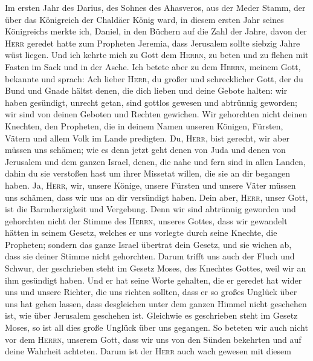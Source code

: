  Im ersten Jahr des Darius, des Sohnes des Ahasveros, aus
der Meder Stamm, der über das Königreich der Chaldäer König ward,
 in diesem ersten Jahr seines Königreichs merkte ich,
Daniel, in den Büchern auf die Zahl der Jahre, davon der \textsc{Herr}
geredet hatte zum Propheten Jeremia, dass Jerusalem sollte siebzig Jahre
wüst liegen.  Und ich kehrte mich zu Gott dem
\textsc{Herrn}, zu beten und zu flehen mit Fasten im Sack und in der
Asche.  Ich betete aber zu dem \textsc{Herrn}, meinem
Gott, bekannte und sprach: Ach lieber \textsc{Herr}, du großer und
schrecklicher Gott, der du Bund und Gnade hältst denen, die dich lieben
und deine Gebote halten:  wir haben gesündigt, unrecht
getan, sind gottlos gewesen und abtrünnig geworden; wir sind von deinen
Geboten und Rechten gewichen.  Wir gehorchten nicht deinen
Knechten, den Propheten, die in deinem Namen unseren Königen, Fürsten,
Vätern und allem Volk im Lande predigten.  Du,
\textsc{Herr}, bist gerecht, wir aber müssen uns schämen; wie es denn
jetzt geht denen von Juda und denen von Jerusalem und dem ganzen Israel,
denen, die nahe und fern sind in allen Landen, dahin du sie verstoßen
hast um ihrer Missetat willen, die sie an dir begangen haben.
 Ja, \textsc{Herr}, wir, unsere Könige, unsere Fürsten und
unsere Väter müssen uns schämen, dass wir uns an dir versündigt haben.
 Dein aber, \textsc{Herr}, unser Gott, ist die
Barmherzigkeit und Vergebung. Denn wir sind abtrünnig geworden
 und gehorchten nicht der Stimme des \textsc{Herrn},
unseres Gottes, dass wir gewandelt hätten in seinem Gesetz, welches er
uns vorlegte durch seine Knechte, die Propheten;  sondern
das ganze Israel übertrat dein Gesetz, und sie wichen ab, dass sie
deiner Stimme nicht gehorchten. Darum trifft uns auch der Fluch und
Schwur, der geschrieben steht im Gesetz Moses, des Knechtes Gottes, weil
wir an ihm gesündigt haben.  Und er hat seine Worte
gehalten, die er geredet hat wider uns und unsere Richter, die uns
richten sollten, dass er so großes Unglück über uns hat gehen lassen,
dass desgleichen unter dem ganzen Himmel nicht geschehen ist, wie über
Jerusalem geschehen ist.  Gleichwie es geschrieben steht
im Gesetz Moses, so ist all dies große Unglück über uns gegangen. So
beteten wir auch nicht vor dem \textsc{Herrn}, unserem Gott, dass wir
uns von den Sünden bekehrten und auf deine Wahrheit achteten.
 Darum ist der \textsc{Herr} auch wach gewesen mit diesem

